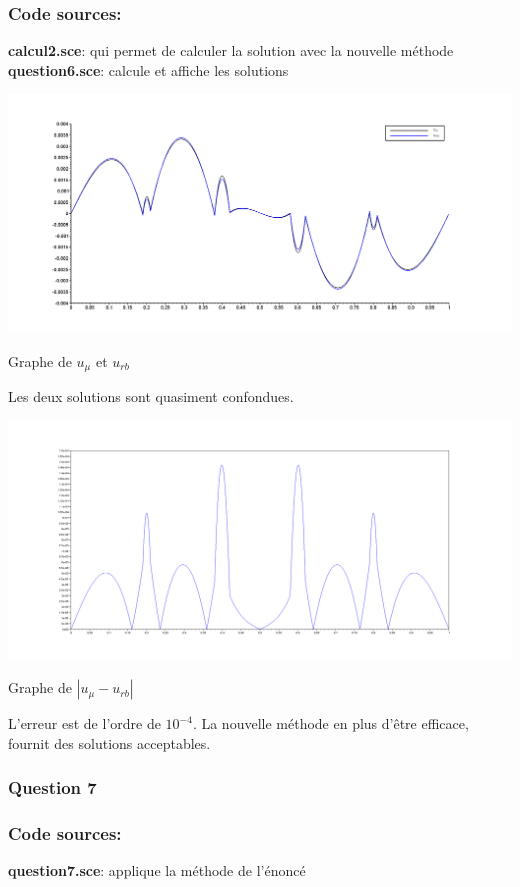 \documentclass{article}
\newcommand{\Q}[1]{\subsubsection*{Question #1}}
\newcommand{\Code}[2]{\textbf{#1}: #2\\}
\newcommand{\Source}[0]{\subsubsection*{Code sources:}}
\begin{document}
\Source
\Code{calcul2.sce}{qui permet de calculer la solution avec la nouvelle méthode}
\Code{question6.sce}{calcule et affiche les solutions}

\begin{center}
\includegraphics[scale=0.25]{img/q6-1.png}

Graphe de $u_\mu$ et $u_{rb}$
\end{center}

Les deux solutions sont quasiment confondues.

\begin{center}
\includegraphics[scale=0.25]{img/q6-2.png}

Graphe de $|u_\mu -u_{rb}|$
\end{center}



L'erreur est de l'ordre de $10^{-4}$. La nouvelle méthode en plus d'être efficace, fournit des solutions acceptables.

\Q{7}
\Source
\Code{question7.sce}{applique la méthode de l'énoncé}
\end{document}
